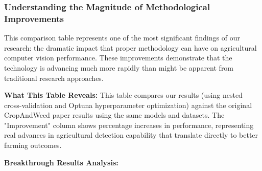 \begin{table}[H]
\centering
\caption{Comparison with Original CropAndWeed Paper Results (50 Epochs)}
\label{tab:baseline_comparison_50}
\end{table}

\subsubsection{Understanding the Magnitude of Methodological Improvements}

This comparison table represents one of the most significant findings of our research: the dramatic impact that proper methodology can have on agricultural computer vision performance. These improvements demonstrate that the technology is advancing much more rapidly than might be apparent from traditional research approaches.

\textbf{What This Table Reveals:} This table compares our results (using nested cross-validation and Optuna hyperparameter optimization) against the original CropAndWeed paper results using the same models and datasets. The "Improvement" column shows percentage increases in performance, representing real advances in agricultural detection capability that translate directly to better farming outcomes.

\textbf{Breakthrough Results Analysis:}

